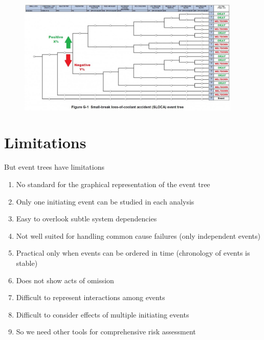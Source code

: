 \documentclass[aspectratio=1610,pdftex,dvipsnames,compress,xcolor={dvipsnames}]{beamer}
\begin{document}
\addtocounter{framenumber}{-1}
\begin{frame}{}
    \begin{figure}
        \centering
        \includegraphics[width=0.95\textwidth]{event.tree_loca.jpg}
    \end{figure}
\end{frame}


\section{Limitations}


\addtocounter{framenumber}{-1}
\begin{frame}{But event trees have limitations}
    \begin{enumerate}[series=outerlist,topsep=0pt,itemsep=11pt,leftmargin=*,label=(\arabic*)]
        \item[]No standard for the graphical representation of the event tree
        \item[]Only one initiating event can be studied in each analysis
        \item[]Easy to overlook subtle system dependencies
        \item[]Not well suited for handling common cause failures (only independent events)
        \item[]Practical only when events can be ordered in time (chronology of events is stable) 
        \item[]Does not show acts of omission
        \item[]Difficult to represent interactions among events  
        \item[]Difficult to consider effects of multiple initiating events
        \item[]So we need other tools for comprehensive risk assessment
    \end{enumerate}
\end{frame}
\end{document}
